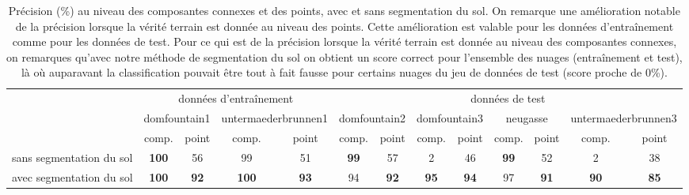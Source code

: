 \begin{table}[p]
\tiny
\begin{tabular}{l|c|c|c|c|c|c|c|c|c|c|c|c|}
\cline{2-13}
                                               & \multicolumn{4}{c|}{données d'entraînement}                                  & \multicolumn{8}{c|}{données de test}                                                                                                             \\ \cline{2-13} 
                                               & \multicolumn{2}{c|}{domfountain1} & \multicolumn{2}{c|}{untermaederbrunnen1} & \multicolumn{2}{c|}{domfountain2} & \multicolumn{2}{c|}{domfountain3} & \multicolumn{2}{c|}{neugasse} & \multicolumn{2}{c|}{untermaederbrunnen3} \\ \cline{2-13} 
                                               & comp.            & point          & comp.               & point              & comp.           & point           & comp.           & point           & comp.         & point         & comp.               & point              \\ \hline
\multicolumn{1}{|l|}{sans segmentation du sol} & \textbf{100}     & 56             & 99                  & 51                 & \textbf{99}     & 57              & 2               & 46              & \textbf{99}   & 52            & 2                   & 38                 \\ \hline
\multicolumn{1}{|l|}{avec segmentation du sol} & \textbf{100}     & \textbf{92}    & \textbf{100}        & \textbf{93}        & 94              & \textbf{92}     & \textbf{95}     & \textbf{94}     & 97            & \textbf{91}   & \textbf{90}         & \textbf{85}        \\ \hline
\end{tabular}
\caption{Précision (\%) au niveau des composantes connexes et des points, avec et sans segmentation du sol. On remarque une amélioration notable de la précision lorsque la vérité terrain est donnée au niveau des points. Cette amélioration est valable pour les données d'entraînement comme pour les données de test. Pour ce qui est de la précision lorsque la vérité terrain est donnée au niveau des composantes connexes, on remarques qu'avec notre méthode de segmentation du sol on obtient un score correct pour l'ensemble des nuages (entraînement et test), là où auparavant la classification pouvait être tout à fait fausse pour certains nuages du jeu de données de test (score proche de $0$\%).}
\label{table:ground}
\end{table}